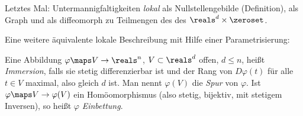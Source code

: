 Letztes Mal: Untermannigfaltigkeiten \emph{lokal} als Nullstellengebilde (Definition), als Graph und als diffeomorph zu Teilmengen des des \( \reals^d\times\zeroset \).

Eine weitere äquivalente lokale Beschreibung mit Hilfe einer Parametrisierung:
\begin{definition}
  Eine Abbildung \( \varphi\maps V\to \reals^n \), \( V\subset \reals^d \) offen, \( d\leq n \), heißt \emph{Immersion}, falls sie stetig differenzierbar ist und der Rang von \( D\varphi(t) \) für alle \( t\in V \) maximal, also gleich \( d \) ist. Man nennt \( \varphi(V) \) die \emph{Spur} von \( \varphi \). Ist \( \varphi\maps V\to \varphi(V) \) ein Homöomorphismus (also stetig, bijektiv, mit stetigem Inversen), so heißt \( \varphi \) \emph{Einbettung}. 
\end{definition}
